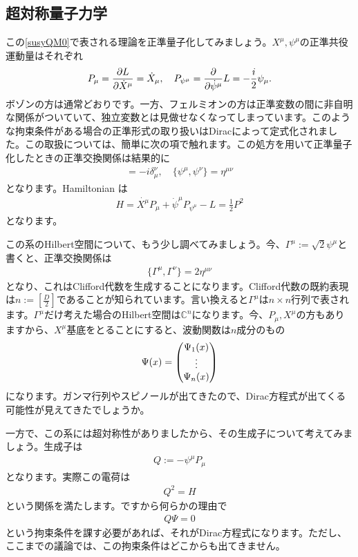 \documentclass[report,paper=a4, fontsize=12pt, line_length=16cm, number_of_lines=34,dvipdfmx]{jlreq}
\numberwithin{equation}{chapter}
\numberwithin{equation}{section}
\newcommand{\Cb}{\mathbb{C}}
\begin{document}
\subsection{超対称量子力学}\label{subsec:susyQM}
この\eqref{susyQM0}で表される理論を正準量子化してみましょう。$X^{\mu},\psi^{\mu}$の正準共役運動量はそれぞれ
\begin{align}
  P_{\mu}=\pdv{L}{\dot{X}^{\mu}}=\dot{X}_{\mu},\quad
  P_{\psi^{\mu}}=\pdv{\dot{\psi}^{\mu}}L=-\frac{i}{2}\psi_{\mu}.
\end{align}
ボゾンの方は通常どおりです。一方、フェルミオンの方は正準変数の間に非自明な関係がついていて、独立変数とは見做せなくなってしまっています。このような拘束条件がある場合の正準形式の取り扱いはDiracによって定式化されました。この取扱については、簡単に次の項で触れます。この処方を用いて正準量子化したときの正準交換関係は結果的に
\begin{align}
  [P_{\mu},X^{\nu}]=-i\delta_{\mu}^{\nu},\quad
  \{\psi^{\mu},\psi^{\nu}\}=\eta^{\mu\nu}
\end{align}
となります。Hamiltonian は
\begin{align}
  H=\dot{X^{\mu}}P_{\mu}+\dot{\psi}^{\mu}P_{\psi^{\mu}}-L=\frac12 P^2
\end{align}
となります。

この系のHilbert空間について、もう少し調べてみましょう。今、$\Gamma^{\mu}:=\sqrt{2}\psi^{\mu}$と書くと、正準交換関係は
\begin{align}
  \{\Gamma^{\mu},\Gamma^{\nu}\}=2\eta^{\mu\nu}
\end{align}
となり、これはClifford代数を生成することになります。Clifford代数の既約表現は$n:=\left[\frac{D}{2}\right]$であることが知られています。言い換えると$\Gamma^{\mu}$は$n\times n$行列で表されます。$\Gamma^{\mu}$だけ考えた場合のHilbert空間は$\Cb^n$になります。今、$P_{\mu},X^{\mu}$の方もありますから、$X^{\mu}$基底をとることにすると、波動関数は$n$成分のもの
\begin{align}
  \Psi(x)=\mqty(
    \Psi_1(x)\\
    \vdots\\
    \Psi_n(x)
  )
\end{align}
になります。ガンマ行列やスピノールが出てきたので、Dirac方程式が出てくる可能性が見えてきたでしょうか。

一方で、この系には超対称性がありましたから、その生成子について考えてみましょう。生成子は
\begin{align}
  Q:=-\psi^{\mu}P_{\mu}
\end{align}
となります。実際この電荷は
\begin{align}
  Q^2=H
\end{align}
という関係を満たします。ですから何らかの理由で
\begin{align}
  Q\Psi=0
\end{align}
という拘束条件を課す必要があれば、それがDirac方程式になります。ただし、ここまでの議論では、この拘束条件はどこからも出てきません。
\end{document}
